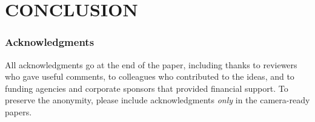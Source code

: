 \documentclass[twoside]{article}
\begin{document}
\section{CONCLUSION}

\subsubsection*{Acknowledgments}
All acknowledgments go at the end of the paper, including thanks to reviewers who gave useful comments, to colleagues who contributed to the ideas, and to funding agencies and corporate sponsors that provided financial support. 
To preserve the anonymity, please include acknowledgments \emph{only} in the camera-ready papers.


\end{document}
